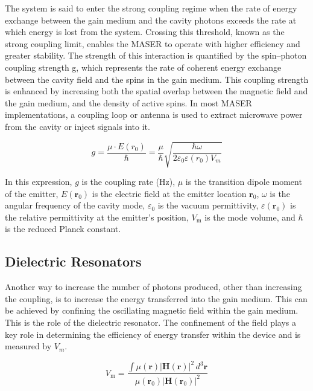The system is said to enter the strong coupling regime when the rate of energy
exchange between the gain medium and the cavity photons exceeds the rate at
which energy is lost from the system. Crossing this threshold, known as the
strong coupling limit, enables the MASER to operate with higher efficiency and
greater
stability\autocite{ng2022move, breeze2015enhanced, purcell1995spontaneous}. The
strength of this interaction is quantified by the spin–photon coupling strength
g, which represents the rate of coherent energy exchange between the cavity
field and the spins in the gain medium\autocite{wen2023spin}. This coupling
strength is enhanced by increasing both the spatial overlap between the magnetic
field and the gain medium, and the density of active
spins\autocite{breeze2015enhanced,purcell1995spontaneous}. In most MASER
implementations, a coupling loop or antenna is used to extract microwave power
from the cavity or inject signals into
it\autocite{ali2020feeding, oxborrow2012room}.

\begin{equation}
  g = \frac{\mu \cdot E(r_0)}{\hbar}
    = \frac{\mu}{\hbar}
      \sqrt{\frac{\hbar \omega}{2 \varepsilon_0 \varepsilon(r_0) V_m}}
  \label{eq:coupling_rate}
\end{equation}

In this expression, $g$ is the coupling rate (Hz), $\mu$ is the transition
dipole moment of the emitter, $E(\mathbf{r}_0)$ is the electric field at the
emitter location $\mathbf{r}_0$, $\omega$ is the angular frequency of the cavity
mode, $\varepsilon_0$ is the vacuum permittivity, $\varepsilon(\mathbf{r}_0)$ is
the relative permittivity at the emitter's position, $V_{\text{m}}$ is the mode
volume, and $\hbar$ is the reduced Planck constant.


\subsection{Dielectric Resonators}
\label{sec:subsection2}
Another way to increase the number of photons produced, other than increasing
the coupling, is to increase the energy transferred into the gain medium. This
can be achieved by confining the oscillating magnetic field within the gain
medium. This is the role of the dielectric
resonator\autocite{oxborrow2012room, meher2020design}. The confinement of the
field plays a key role in determining the efficiency of energy transfer within
the device and is measured by $V_m$.

\begin{equation}
  V_{\text{m}} =
    \frac{\int \mu(\mathbf{r}) |\mathbf{H}(\mathbf{r})|^2 \, d^3\mathbf{r}}
         {\mu(\mathbf{r}_0) |\mathbf{H}(\mathbf{r}_0)|^2}
  \label{eq:mode_volume}
\end{equation}

